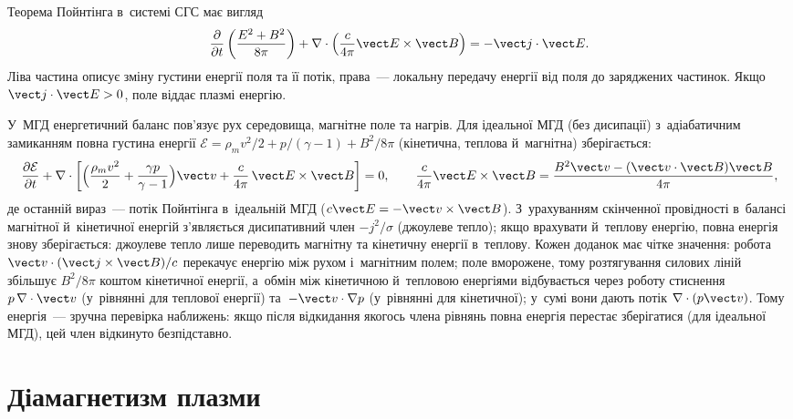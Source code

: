 Теорема Пойнтінга в~системі СГС має вигляд
\begin{equation}\label{eq:poynting-theorem-plasma}
\frac{\partial}{\partial t}\left(\frac{E^2+B^2}{8\pi}\right)
+\nabla\cdot\left(\frac{c}{4\pi}\vect E\times\vect B\right)
=-\vect j\cdot\vect E.
\end{equation}
Ліва частина описує зміну густини енергії поля та її потік, права~--- локальну передачу
енергії від поля до заряджених частинок. Якщо $\vect j\cdot\vect E>0$, поле віддає плазмі
енергію.

У~МГД енергетичний баланс пов'язує рух середовища, магнітне поле та нагрів. Для ідеальної
МГД (без дисипації) з~адіабатичним замиканням повна густина енергії
$\mathcal E=\rho_mv^2/2+p/(\gamma-1)+B^2/8\pi$ (кінетична, теплова й~магнітна) зберігається:
\begin{equation}\label{eq:mhd-energy}
\frac{\partial\mathcal E}{\partial t}
+\nabla\cdot\left[\Bigl(\frac{\rho_mv^2}2+\frac{\gamma p}{\gamma-1}\Bigr)\vect v
+\frac{c}{4\pi}\,\vect E\times\vect B\right]=0,
\qquad
\frac{c}{4\pi}\vect E\times\vect B=\frac{B^2\vect v-(\vect v\cdot\vect B)\vect B}{4\pi},
\end{equation}
де останній вираз~--- потік Пойнтінга в~ідеальній МГД ($c\vect E=-\vect v\times\vect B$). З~урахуванням
скінченної провідності в~балансі магнітної й~кінетичної енергій з'являється дисипативний член
$-j^2/\sigma$ (джоулеве тепло); якщо врахувати й~теплову енергію, повна енергія знову
зберігається: джоулеве тепло лише переводить магнітну та кінетичну енергії в~теплову. Кожен доданок має чітке значення: робота
$\vect v\cdot(\vect j\times\vect B)/c$ перекачує енергію між рухом і~магнітним полем; поле
вморожене, тому розтягування силових ліній збільшує $B^2/8\pi$ коштом кінетичної енергії,
а~обмін між кінетичною й~тепловою енергіями відбувається через роботу стиснення $p\,\nabla\cdot\vect v$
(у~рівнянні для теплової енергії) та~$-\vect v\cdot\nabla p$ (у~рівнянні для кінетичної); у~сумі вони дають
потік $\nabla\cdot(p\vect v)$. Тому енергія~--- зручна перевірка наближень: якщо після відкидання якогось члена рівнянь повна енергія
перестає зберігатися (для ідеальної МГД), цей член відкинуто безпідставно.


\section{Діамагнетизм плазми}\label{sec:diamagnetism}


